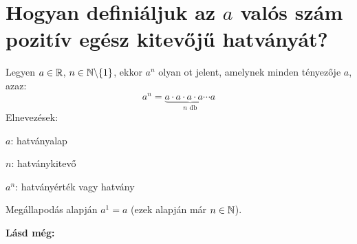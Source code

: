 
\section{Hogyan definiáljuk az \texorpdfstring{$a$}{a} valós szám pozitív egész
kitevőjű hatványát?}

\begin{defin}[Hatvány]
Legyen $a \in \mathbb{R}$, $n \in \mathbb{N} \backslash \{1\}$, ekkor $a^n$ olyan
ot jelent, amelynek minden tényezője $a$, azaz:
\[
a^n = \underbrace{a \cdot a \cdot a \cdot a \cdots{ } a}_{n \text{ db}}
\]
Elnevezések:

$a$: hatványalap

$n$: hatványkitevő

$a^n$: hatványérték vagy hatvány

Megállapodás alapján $a^1 = a$ (ezek alapján már $n \in \mathbb{N}$).
\end{defin}

\textbf{Lásd még:}

